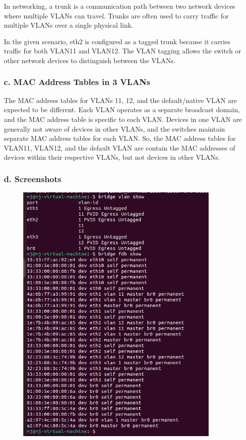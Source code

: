 \documentclass{report}
\begin{document}
In networking, a trunk is a communication path between two network devices where multiple VLANs can travel.
Trunks are often used to carry traffic for multiple VLANs over a single physical link.

In the given scenario, eth2 is configured as a tagged trunk because it carries traffic for both VLAN11 and VLAN12.
The VLAN tagging allows the switch or other network devices to distinguish between the VLANs.

\subsubsection*{c. MAC Address Tables in 3 VLANs}
The MAC address tables for VLANs 11, 12, and the default/native VLAN are expected to be different. 
Each VLAN operates as a separate broadcast domain, and the MAC address table is specific to each VLAN.
Devices in one VLAN are generally not aware of devices in other VLANs, and the switches maintain separate MAC address tables for each VLAN.
So, the MAC address tables for VLAN11, VLAN12, and the default VLAN are contain the MAC addresses of devices within their respective VLANs, but not devices in other VLANs.

\subsubsection*{d. Screenshots}
\begin{figure}[h] 
  \centering 
  \includegraphics[width=0.9\textwidth]{31.jpg} 
\end{figure} 
\end{document}
